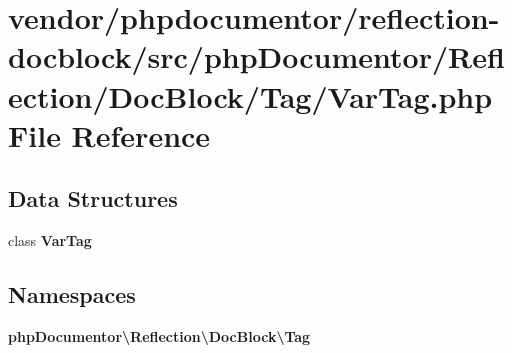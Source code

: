\section{vendor/phpdocumentor/reflection-\/docblock/src/php\+Documentor/\+Reflection/\+Doc\+Block/\+Tag/\+Var\+Tag.php File Reference}
\label{_var_tag_8php}
\subsection*{Data Structures}
\begin{DoxyCompactItemize}
\item 
class {\bf Var\+Tag}
\end{DoxyCompactItemize}
\subsection*{Namespaces}
\begin{DoxyCompactItemize}
\item 
 {\bf php\+Documentor\textbackslash{}\+Reflection\textbackslash{}\+Doc\+Block\textbackslash{}\+Tag}
\end{DoxyCompactItemize}
